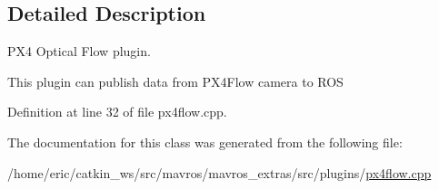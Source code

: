 \subsection{Detailed Description}
P\+X4 Optical Flow plugin. 

This plugin can publish data from P\+X4\+Flow camera to R\+OS 

Definition at line 32 of file px4flow.\+cpp.



The documentation for this class was generated from the following file\+:\begin{DoxyCompactItemize}
\item 
/home/eric/catkin\+\_\+ws/src/mavros/mavros\+\_\+extras/src/plugins/\mbox{\hyperlink{px4flow_8cpp}{px4flow.\+cpp}}\end{DoxyCompactItemize}
